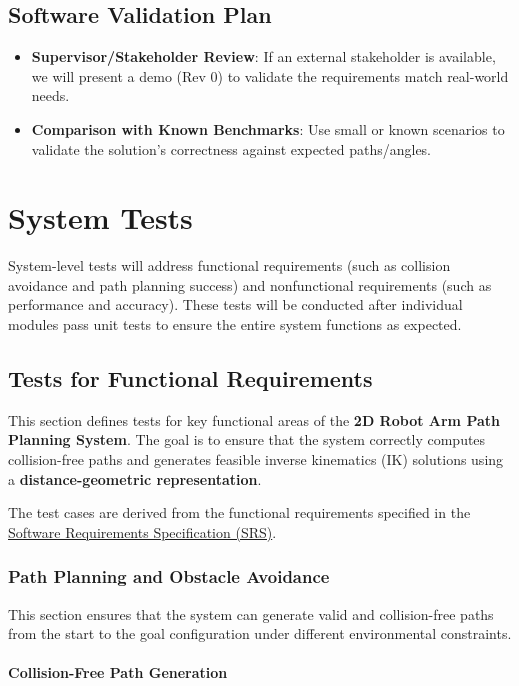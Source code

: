 \documentclass[12pt, titlepage]{article}
\begin{document}
\subsection{Software Validation Plan}

\begin{itemize}
  \item \textbf{Supervisor/Stakeholder Review}: If an external stakeholder is available, we will present a demo (Rev 0) to validate the requirements match real-world needs.
  \item \textbf{Comparison with Known Benchmarks}: Use small or known scenarios to validate the solution’s correctness against expected paths/angles.
\end{itemize}

\section{System Tests}

System-level tests will address functional requirements (such as collision avoidance and path planning success) and nonfunctional requirements (such as performance and accuracy). These tests will be conducted after individual modules pass unit tests to ensure the entire system functions as expected.
\subsection{Tests for Functional Requirements}

This section defines tests for key functional areas of the \textbf{2D Robot Arm Path Planning System}. The goal is to ensure that the system correctly computes collision-free paths and generates feasible inverse kinematics (IK) solutions using a \textbf{distance-geometric representation}. 

The test cases are derived from the functional requirements specified in the \href{https://github.com/FangZiyang/CAS741-Ryan/blob/main/docs/SRS/SRS.pdf}{Software Requirements Specification (SRS)}. 

\subsubsection{Path Planning and Obstacle Avoidance}

This section ensures that the system can generate valid and collision-free paths from the start to the goal configuration under different environmental constraints.

\paragraph{Collision-Free Path Generation}
\end{document}
